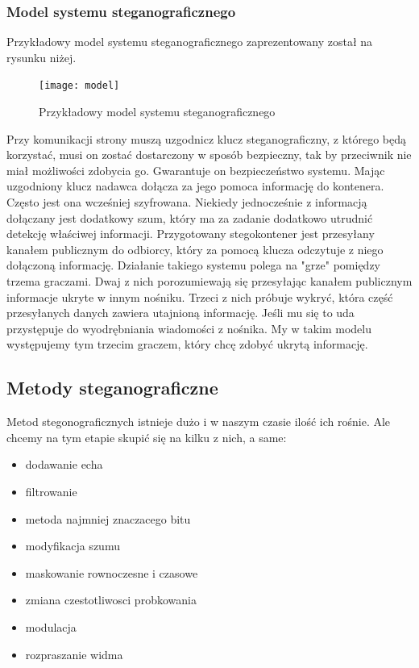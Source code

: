 \documentclass[a4paper,titleauthor]{mwart}
\begin{document}
	\subsubsection{Model systemu steganograficznego}
	
	Przykładowy model systemu steganograficznego zaprezentowany został na rysunku niżej.
	
	\begin{figure}[h]
		\centering
		\texttt{[image: model]}
		\caption{Przykładowy model systemu steganograficznego}
	\end{figure}
	
	Przy komunikacji strony muszą uzgodnicz klucz steganograficzny, z którego będą korzystać, musi on zostać dostarczony w sposób bezpieczny, tak by przeciwnik nie miał możliwości zdobycia go. Gwarantuje on bezpieczeństwo systemu. Mając uzgodniony klucz nadawca dołącza za jego pomoca informację do kontenera. Często jest ona wcześniej szyfrowana. Niekiedy jednocześnie z informacją dołączany jest dodatkowy szum, który ma za zadanie dodatkowo utrudnić detekcję właściwej informacji. Przygotowany stegokontener jest przesyłany kanałem publicznym do odbiorcy, który za pomocą klucza odczytuje z niego dołączoną informację. Działanie takiego systemu polega na "grze" pomiędzy trzema graczami. Dwaj z nich porozumiewają się przesyłając kanałem publicznym informacje ukryte w innym nośniku. Trzeci z nich próbuje wykryć, która część przesyłanych danych zawiera utajnioną informację. Jeśli mu się to uda przystępuje do wyodrębniania wiadomości z nośnika. My w takim modelu występujemy tym trzecim graczem, który chcę zdobyć ukrytą informację.
	
	\subsection{Metody steganograficzne}
	
	Metod stegonograficznych istnieje dużo i w naszym czasie ilość ich rośnie. Ale chcemy na tym etapie skupić się na kilku z nich, a same: \newline
	\begin{itemize}
		\item dodawanie echa
		\item filtrowanie
		\item metoda najmniej znaczacego bitu
		\item modyfikacja szumu
		\item maskowanie rownoczesne i czasowe
		\item zmiana czestotliwosci probkowania 
		\item modulacja
		\item rozpraszanie widma
	\end{itemize}
\end{document}

